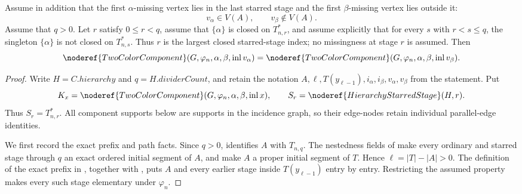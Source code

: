 \begin{lemma}
Assume in addition that the first $\alpha$-missing vertex lies in the
last starred stage and the first $\beta$-missing vertex lies outside it:
\[
        v_\alpha\in V(A),\qquad v_\beta\notin V(A).
\]
Assume that $q>0$.  Let $r$ satisfy $0\leq r<q$, assume that
$\{\alpha\}$ is closed on $T_{n,r}^{*}$, and assume explicitly that
for every $s$ with $r<s\leq q$, the singleton $\{\alpha\}$ is not
closed on $T_{n,s}^{*}$.  Thus $r$ is the largest closed starred-stage
index; no missingness at stage $r$ is assumed.  Then
\[
 \noderef{TwoColorComponent}(G,\varphi_n,\alpha,\beta,
       \operatorname{inl}v_\alpha)
 =
 \noderef{TwoColorComponent}(G,\varphi_n,\alpha,\beta,
       \operatorname{inl}v_\beta).
\]
\end{lemma}
\begin{proof}
Write $H=C.\mathit{hierarchy}$ and $q=H.\mathit{dividerCount}$, and
retain the notation $A,\ell,T(y_{\ell-1}),i_\alpha,i_\beta,
v_\alpha,v_\beta$ from the statement.  Put
\[
 K_x=\noderef{TwoColorComponent}
       (G,\varphi_n,\alpha,\beta,\operatorname{inl}x),
 \qquad S_r=\noderef{HierarchyStarredStage}(H,r).
\]
Thus $S_r=T_{n,r}^{*}$.  All component supports below are supports in
the incidence graph, so their edge-nodes retain individual parallel-edge
identities.

We first record the exact prefix and path facts.  Since $q>0$,
 identifies $A$ with $T_{n,q}$.
The nestedness fields of  make every
ordinary and starred stage through $q$ an exact ordered initial segment
of $A$, and make $A$ a proper initial segment of $T$.  Hence
$\ell=|T|-|A|>0$.  The definition of the exact prefix in
, together with
, puts $A$ and every earlier stage
inside $T(y_{\ell-1})$ entry by entry.  Restricting the assumed
 property makes every such stage
elementary under $\varphi_n$.


\end{proof}
